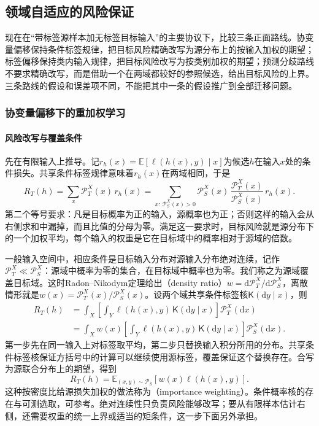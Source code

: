 \subsection{领域自适应的风险保证}
\label{sec:adaptation-risk}

现在在“带标签源样本加无标签目标输入”的主要协议下，比较三条正面路线。协变量偏移保持条件标签规律，把目标风险精确改写为源分布上的按输入加权的期望；标签偏移保持类内输入规律，把目标风险改写为按类别加权的期望；预测分歧路线不要求精确改写，而是借助一个在两域都较好的参照候选，给出目标风险的上界。三条路线的假设和误差项不同，不能把其中一条的假设推广到全部迁移问题。

\subsubsection{协变量偏移下的重加权学习}
\label{sec:adaptation-coverage}

\paragraph{风险改写与覆盖条件}
先在有限输入上推导。记$r_h(x)=\mathbb E[\ell(h(x),y)\mid x]$为候选$h$在输入$x$处的条件损失。共享条件标签规律意味着$r_h(x)$在两域相同，于是
\[
 R_T(h)=\sum_x\mathcal P_T^X(x)\,r_h(x)
       =\sum_{x:\,\mathcal P_S^X(x)>0}\mathcal P_S^X(x)\,
        \frac{\mathcal P_T^X(x)}{\mathcal P_S^X(x)}\,r_h(x).
\]
第二个等号要求：凡是目标概率为正的输入，源概率也为正；否则这样的输入会从右侧求和中漏掉，而且比值的分母为零。满足这一要求时，目标风险就是源分布下的一个加权平均，每个输入的权重是它在目标域中的概率相对于源域的倍数。

一般输入空间中，相应条件是目标输入分布对源输入分布绝对连续，记作$\mathcal P_T^X\ll\mathcal P_S^X$：源域中概率为零的集合，在目标域中概率也为零。我们称之为源域覆盖目标域。这时Radon--Nikodym定理给出（density ratio）$w=\mathrm d\mathcal P_T^X/\mathrm d\mathcal P_S^X$，离散情形就是$w(x)=\mathcal P_T^X(x)/\mathcal P_S^X(x)$。设两个域共享条件标签核$\mathsf K(\mathrm dy\mid x)$，则
\[
 \begin{aligned}
 R_T(h)
 &=\int_X\!\left[\int_Y\ell(h(x),y)\,\mathsf K(\mathrm dy\mid x)\right]
          \mathcal P_T^X(\mathrm dx)\\
 &=\int_X\!w(x)\left[\int_Y\ell(h(x),y)\,\mathsf K(\mathrm dy\mid x)\right]
          \mathcal P_S^X(\mathrm dx).
 \end{aligned}
\]
第一步先在同一输入上对标签取平均，第二步只替换输入积分所用的分布。共享条件标签核保证方括号中的计算可以继续使用源标签，覆盖保证这个替换存在。合写为源联合分布上的期望，得到
\begin{equation}
 R_T(h)=\mathbb E_{(x,y)\sim\mathcal P_S}[w(x)\ell(h(x),y)].
 \label{eq:covariate-risk-identity}
\end{equation}
这种按密度比给源损失加权的做法称为（importance weighting）。条件概率核的存在与可测选取，可参考。绝对连续性只负责风险能够改写；要从有限样本估计右侧，还需要权重的统一上界或适当的矩条件，这一步下面另外承担。

